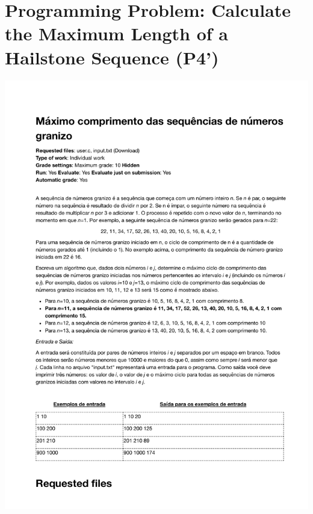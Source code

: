 \section{Programming Problem: Calculate the Maximum Length of a Hailstone Sequence (P4')}
\label{annex:pilot-study-p4}
\includegraphics[page=1,width=1\textwidth]{images/annex/pilot-study-p4.pdf}

\newpage
